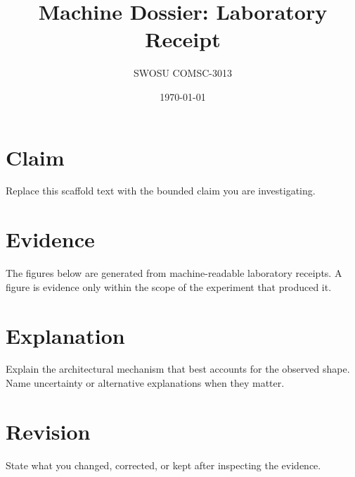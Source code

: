 \documentclass[11pt]{article}
\title{Machine Dossier: Laboratory Receipt}
\author{SWOSU COMSC-3013}
\date{\today}
\begin{document}
\maketitle
\section*{Claim}
Replace this scaffold text with the bounded claim you are investigating.

\section*{Evidence}
The figures below are generated from machine-readable laboratory receipts. A figure is evidence only within the scope of the experiment that produced it.


\section*{Explanation}
Explain the architectural mechanism that best accounts for the observed shape. Name uncertainty or alternative explanations when they matter.

\section*{Revision}
State what you changed, corrected, or kept after inspecting the evidence.
\end{document}
